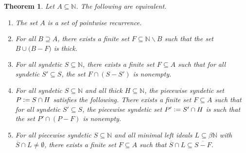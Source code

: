 \documentclass[letter,11pt]{article}
\theoremstyle{plain}
\newtheorem{theorem}{Theorem}
\theoremstyle{definition}
\theoremstyle{plain}
\theoremstyle{plain}
\numberwithin{equation}{section}
\newcommand{\N}{\mathbb{N}}
\newcommand{\defeq}{\vcentcolon=}
\renewcommand{\setminus}{\backslash}
\begin{document}
\begin{theorem}
\label{thm_dct_combo_characterizations}
    Let $A \subseteq \N$.  The following are equivalent.
    \begin{enumerate}
        \item
        \label{item_dct_def_char}
        The set $A$ is a set of pointwise recurrence.

        \item
        \label{item_dct_sif_char}
        For all $B \supseteq A$, there exists a finite set $F \subseteq \N \setminus B$ such that the set $B \cup \big( B-F \big)$ is thick.

        \item
        \label{item_condition_one_dct}
        For all syndetic $S \subseteq \N$, there exists a finite set $F \subseteq A$ such that for all syndetic $S' \subseteq S$, the set $F \cap (S - S')$ is nonempty.

        \item \label{item:complement_thick_dct_characterization_v2}
        For all syndetic $S \subseteq \N$ and all thick $H \subseteq \N$, the piecewise syndetic set $P \defeq S \cap H$ satisfies the following.  There exists a finite set $F \subseteq A$ such that for all syndetic $S' \subseteq S$, the piecewise syndetic set $P' \defeq S' \cap H$ is such that the set $P' \cap (P - F)$ is nonempty.
        
        \item
        \label{item:complement_psstar_dct_characterization_star_fixed}
        For all piecewise syndetic $S \subseteq \N$ and all minimal left ideals $L \subseteq \beta \N$ with $\overline{S} \cap L \neq \emptyset$, there exists a finite set $F \subseteq A$ such that $\overline{S} \cap L \subseteq \overline{S-F}$.
    \end{enumerate}
\end{theorem}
\end{document}
